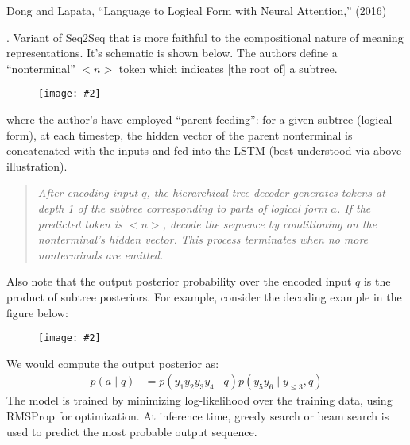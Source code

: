\documentclass[11pt]{article}
\newcommand\myfig[2][0.3\textwidth]{\begin{figure}[h!]\centering\texttt{[image: \#2]}\end{figure}}
\newcommand\p{\Needspace{10\baselineskip} \noindent}
\begin{document}


\vspace{-1em}
{\footnotesize Dong and Lapata, ``Language to Logical Form with Neural Attention,'' (2016)}

\p {}. Variant of Seq2Seq that is more faithful to the compositional nature of meaning representations. It's schematic is shown below. The authors define a ``nonterminal'' $<n>$ token which indicates [the root of] a subtree.

\myfig[0.5\textwidth]{Seq2Tree.png}

where the author's have employed ``parent-feeding'': for a given subtree (logical form), at each timestep, the hidden vector of the parent nonterminal is concatenated with the inputs and fed into the LSTM (best understood via above illustration). 

\begin{quote}
	{\itshape After encoding input $q$, the hierarchical tree decoder generates tokens at depth 1 of the subtree corresponding to parts of logical form $a$. If the predicted token is $<n>$, decode the sequence by conditioning on the nonterminal's hidden vector. This process terminates when no more nonterminals are emitted. }
\end{quote}

Also note that the output posterior probability over the encoded input $q$ is the product of subtree posteriors. For example, consider the decoding example in the figure below:
\myfig[0.4\textwidth]{Seq2TreeExample.png}

We would compute the output posterior as:
\begin{align}
	p(a \mid q) &= p(y_1 y_2 y_3 y_4 \mid q) p(y_5 y_6 \mid y_{\le 3},q)
\end{align}
The model is trained by minimizing log-likelihood over the training data, using RMSProp for optimization. At inference time, greedy search or beam search is used to predict the most probable output sequence.








\end{document}
